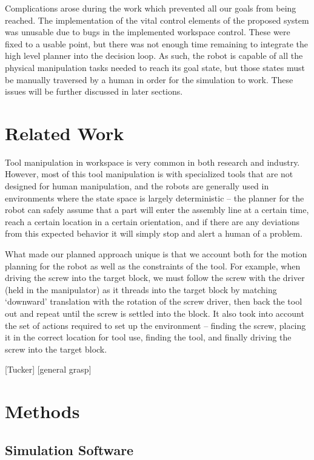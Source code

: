 \documentclass[10pt, conference]{IEEEtran}
\begin{document}
  Complications arose during the work which prevented all our goals from
  being reached. The implementation of the vital control elements of the
  proposed system was unusable due to bugs in the implemented workspace
  control. These were fixed to a usable point, but there was not enough
  time remaining to integrate the high level planner into the decision
  loop. As such, the robot is capable of all the physical manipulation
  tasks needed to reach its goal state, but those states must be
  manually traversed by a human in order for the simulation to
  work. These issues will be further discussed in later sections.
\section{Related Work}
\label{sec-2}

  Tool manipulation in workspace is very common in both research and
  industry. However, most of this tool manipulation is with specialized
  tools that are not designed for human manipulation, and the robots are
  generally used in environments where the state space is largely
  deterministic -- the planner for the robot can safely assume that a
  part will enter the assembly line at a certain time, reach a certain
  location in a certain orientation, and if there are any deviations
  from this expected behavior it will simply stop and alert a human of a
  problem.

  What made our planned approach unique is that we account both for the
  motion planning for the robot as well as the constraints of the
  tool. For example, when driving the screw into the target block, we
  must follow the screw with the driver (held in the manipulator) as it
  threads into the target block by matching `downward' translation with
  the rotation of the screw driver, then back the tool out and repeat
  until the screw is settled into the block. It also took into account
  the set of actions required to set up the environment -- finding the
  screw, placing it in the correct location for tool use, finding the
  tool, and finally driving the screw into the target block.

  [Tucker]
  [general grasp]
\section{Methods}
\label{sec-3}
\subsection{Simulation Software}
\label{sec-3-1}
\end{document}

